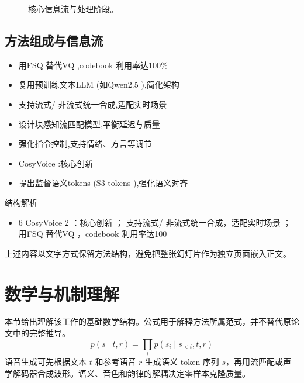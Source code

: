\documentclass[UTF8,11pt,a4paper]{ctexart}
\begin{document}
\begin{figure}[H]
\centering
{}
\caption{核心信息流与处理阶段。}
\end{figure}

\subsection{方法组成与信息流}
\begin{itemize}
\item 用FSQ 替代VQ ,codebook 利用率达100\%
\item 复用预训练文本LLM (如Qwen2.5 ),简化架构
\item 支持流式/ 非流式统一合成,适配实时场景
\item 设计块感知流匹配模型,平衡延迟与质量
\item 强化指令控制,支持情绪、方言等调节
\item CosyVoice :核心创新
\item 提出监督语义tokens (S3 tokens ),强化语义对齐
\end{itemize}

\begin{keybox}{结构解析}
\begin{itemize}
\item 6 CosyVoice 2 ：核心创新 ； 支持流式/ 非流式统一合成，适配实时场景 ； 用FSQ 替代VQ ，codebook 利用率达100\\%
\end{itemize}
\end{keybox}

上述内容以文字方式保留方法结构，避免把整张幻灯片作为独立页面嵌入正文。

\section{数学与机制理解}
本节给出理解该工作的基础数学结构。公式用于解释方法所属范式，并不替代原论文中的完整推导。
\begin{equation}
p(s\mid t,r)=\prod_i p(s_i\mid s_{<i},t,r)
\end{equation}
语音生成可先根据文本 $t$ 和参考语音 $r$ 生成语义 token 序列 $s$，再用流匹配或声学解码器合成波形。语义、音色和韵律的解耦决定零样本克隆质量。
\end{document}
